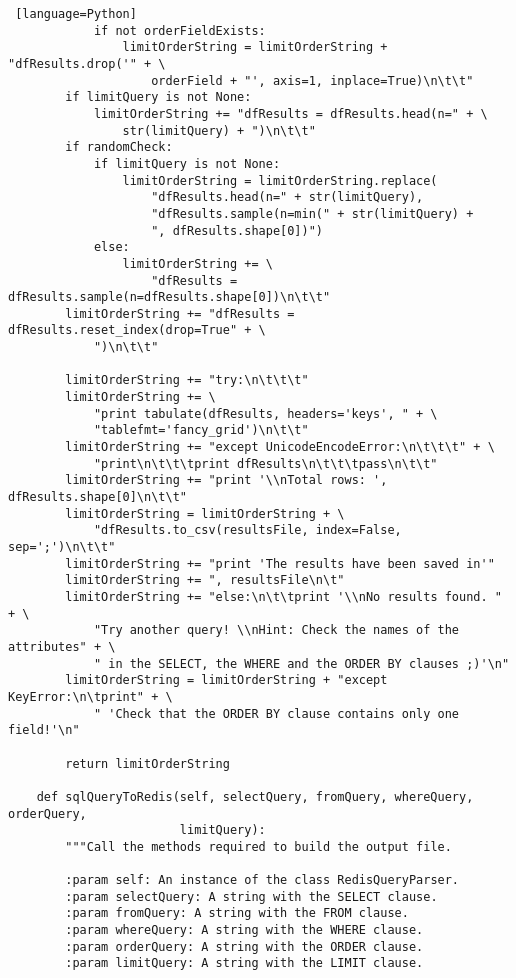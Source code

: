 \documentclass[11pt]{article}
\begin{document}
\begin{lstlisting} [language=Python]
            if not orderFieldExists:
                limitOrderString = limitOrderString + "dfResults.drop('" + \
                    orderField + "', axis=1, inplace=True)\n\t\t"
        if limitQuery is not None:
            limitOrderString += "dfResults = dfResults.head(n=" + \
                str(limitQuery) + ")\n\t\t"
        if randomCheck:
            if limitQuery is not None:
                limitOrderString = limitOrderString.replace(
                    "dfResults.head(n=" + str(limitQuery),
                    "dfResults.sample(n=min(" + str(limitQuery) +
                    ", dfResults.shape[0])")
            else:
                limitOrderString += \
                    "dfResults = dfResults.sample(n=dfResults.shape[0])\n\t\t"
        limitOrderString += "dfResults = dfResults.reset_index(drop=True" + \
            ")\n\t\t"

        limitOrderString += "try:\n\t\t\t"
        limitOrderString += \
            "print tabulate(dfResults, headers='keys', " + \
            "tablefmt='fancy_grid')\n\t\t"
        limitOrderString += "except UnicodeEncodeError:\n\t\t\t" + \
            "print\n\t\t\tprint dfResults\n\t\t\tpass\n\t\t"
        limitOrderString += "print '\\nTotal rows: ', dfResults.shape[0]\n\t\t"
        limitOrderString = limitOrderString + \
            "dfResults.to_csv(resultsFile, index=False, sep=';')\n\t\t"
        limitOrderString += "print 'The results have been saved in'"
        limitOrderString += ", resultsFile\n\t"
        limitOrderString += "else:\n\t\tprint '\\nNo results found. " + \
            "Try another query! \\nHint: Check the names of the attributes" + \
            " in the SELECT, the WHERE and the ORDER BY clauses ;)'\n"
        limitOrderString = limitOrderString + "except KeyError:\n\tprint" + \
            " 'Check that the ORDER BY clause contains only one field!'\n"

        return limitOrderString

    def sqlQueryToRedis(self, selectQuery, fromQuery, whereQuery, orderQuery,
                        limitQuery):
        """Call the methods required to build the output file.

        :param self: An instance of the class RedisQueryParser.
        :param selectQuery: A string with the SELECT clause.
        :param fromQuery: A string with the FROM clause.
        :param whereQuery: A string with the WHERE clause.
        :param orderQuery: A string with the ORDER clause.
        :param limitQuery: A string with the LIMIT clause.


\end{lstlisting}
\end{document}
